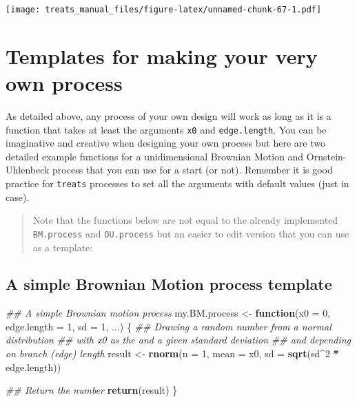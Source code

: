 \documentclass[
]{book}
\newenvironment{Shaded}{\begin{snugshade}}{\end{snugshade}}
\newcommand{\CommentTok}[1]{\textcolor[rgb]{0.56,0.35,0.01}{\textit{#1}}}
\newcommand{\ControlFlowTok}[1]{\textcolor[rgb]{0.13,0.29,0.53}{\textbf{#1}}}
\newcommand{\DataTypeTok}[1]{\textcolor[rgb]{0.13,0.29,0.53}{#1}}
\newcommand{\DecValTok}[1]{\textcolor[rgb]{0.00,0.00,0.81}{#1}}
\newcommand{\KeywordTok}[1]{\textcolor[rgb]{0.13,0.29,0.53}{\textbf{#1}}}
\newcommand{\NormalTok}[1]{#1}
\newcommand{\OperatorTok}[1]{\textcolor[rgb]{0.81,0.36,0.00}{\textbf{#1}}}
\newcommand{\StringTok}[1]{\textcolor[rgb]{0.31,0.60,0.02}{#1}}
\begin{document}
\texttt{[image: treats\_manual\_files/figure-latex/unnamed-chunk-67-1.pdf]}

\hypertarget{templates-for-making-your-very-own-process}{%
\section{Templates for making your very own process}\label{templates-for-making-your-very-own-process}}

As detailed above, any process of your own design will work as long as it is a function that takes at least the arguments \texttt{x0} and \texttt{edge.length}.
You can be imaginative and creative when designing your own process but here are two detailed example functions for a unidimensional Brownian Motion and Ornstein-Uhlenbeck process that you can use for a start (or not).
Remember it is good practice for \texttt{treats} processes to set all the arguments with default values (just in case).

\begin{quote}
Note that the functions below are not equal to the already implemented \texttt{BM.process} and \texttt{OU.process} but an easier to edit version that you can use as a template:
\end{quote}

\hypertarget{a-simple-brownian-motion-process-template}{%
\subsection{A simple Brownian Motion process template}\label{a-simple-brownian-motion-process-template}}

\begin{Shaded}
\begin{Highlighting}[]
\CommentTok{\#\# A simple Brownian motion process}
\NormalTok{my.BM.process \textless{}{-}}\StringTok{ }\ControlFlowTok{function}\NormalTok{(}\DataTypeTok{x0 =} \DecValTok{0}\NormalTok{, }\DataTypeTok{edge.length =} \DecValTok{1}\NormalTok{, }\DataTypeTok{sd =} \DecValTok{1}\NormalTok{, ...) \{}
    \CommentTok{\#\# Drawing a random number from a normal distribution}
    \CommentTok{\#\# with x0 as the and a given standard deviation}
    \CommentTok{\#\# and depending on branch (edge) length}
\NormalTok{    result \textless{}{-}}\StringTok{ }\KeywordTok{rnorm}\NormalTok{(}\DataTypeTok{n =} \DecValTok{1}\NormalTok{, }\DataTypeTok{mean =}\NormalTok{ x0, }\DataTypeTok{sd =} \KeywordTok{sqrt}\NormalTok{(sd}\OperatorTok{\^{}}\DecValTok{2} \OperatorTok{*}\StringTok{ }\NormalTok{edge.length))}

    \CommentTok{\#\# Return the number}
    \KeywordTok{return}\NormalTok{(result)}
\NormalTok{\}}
\end{Highlighting}
\end{Shaded}
\end{document}
